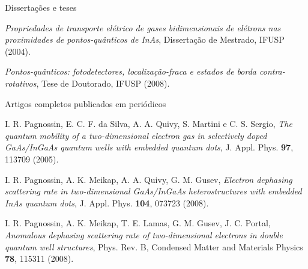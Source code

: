 \begin{compactitem}

	\item Dissertações e teses
	\begin{compactitem}
		\item \textsl{Propriedades de transporte elétrico de gases bidimensionais de elétrons nas proximidades de pontos-quânticos de InAs}, Dissertação de Mestrado, IFUSP (2004).
		\item \textsl{Pontos-quânticos: fotodetectores, localização-fraca e estados de borda contra-rotativos}, Tese de Doutorado, IFUSP (2008).
	\end{compactitem}
	
	\item Artigos completos publicados em periódicos
	\begin{compactitem}
		\item I. R. Pagnossin, E. C. F. da Silva, A. A. Quivy, S. Martini e C. S. Sergio, \textsl{The quantum mobility of a two-dimensional electron gas in selectively doped GaAs/InGaAs quantum wells with embedded quantum dots}, J. Appl. Phys. \textbf{97}, 113709 (2005).
		\item I. R. Pagnossin, A. K. Meikap, A. A. Quivy, G. M. Gusev, \textsl{Electron dephasing scattering rate in two-dimensional GaAs/InGaAs heterostructures with embedded InAs quantum dots}, J. Appl. Phys. \textbf{104}, 073723 (2008).
		\item I. R. Pagnossin, A. K. Meikap, T. E. Lamas, G. M. Gusev, J. C. Portal, \textsl{Anomalous dephasing scattering rate of two-dimensional electrons in double quantum well structures}, Phys. Rev. B, Condensed Matter and Materials Physics \textbf{78}, 115311 (2008). 
	\end{compactitem}
		

\end{compactitem}
